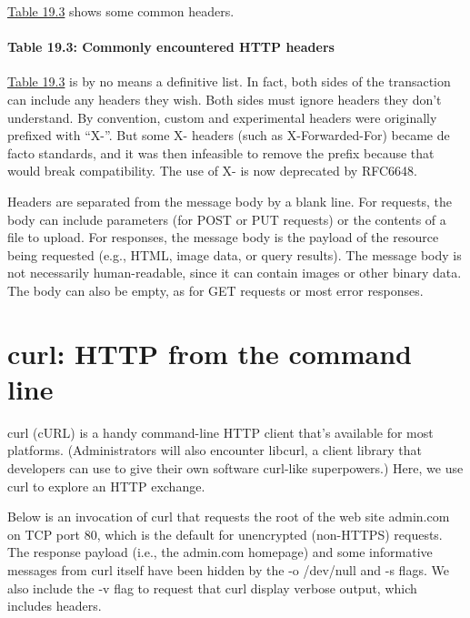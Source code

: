 \protect\hyperlink{part0027_split_003.htmlux5cux23_idTextAnchor1216}{Table
19.3} shows some common headers.

\paragraph[{Table 19.3: }Commonly encountered HTTP
headers]{\texorpdfstring{{Table 19.3:
}\protect\hypertarget{part0027_split_003.htmlux5cux23_idIndexMarker2762}{}{}\protect\hypertarget{part0027_split_003.htmlux5cux23_idTextAnchor1216}{}{}Commonly
encountered HTTP
headers}{Table 19.3: Commonly encountered HTTP headers}}


\protect\hyperlink{part0027_split_003.htmlux5cux23_idTextAnchor1216}{Table
19.3} is by no means a definitive list. In fact, both sides of the
transaction can include any headers they wish. Both sides must ignore
headers they don't understand. By convention, custom and experimental
headers were originally prefixed with ``X-''. But some X- headers (such
as X-Forwarded-For) became de facto standards, and it was then
infeasible to remove the prefix because that would break compatibility.
The use of X- is now deprecated by RFC6648.

Headers are separated from the message body by a blank line. For
requests, the body can include parameters (for POST or PUT requests) or
the contents of a file to upload. For responses, the message body is the
payload of the resource being requested (e.g., HTML, image data, or
query results). The message body is not necessarily human-readable,
since it can contain images or other binary data. The body can also be
empty, as for GET requests or most error responses.


\section{curl: HTTP from the command line}


\protect\hypertarget{part0027_split_004.htmlux5cux23_idIndexMarker2763}{}{}\protect\hypertarget{part0027_split_004.htmlux5cux23_idIndexMarker2764}{}{}{curl}
(cURL) is a handy command-line HTTP client that's available for most
platforms. (Administrators will also encounter {libcurl}, a client
library that developers can use to give their own software {curl}-like
superpowers.) Here, we use {curl} to explore an HTTP exchange.

Below is an invocation of {curl} that requests the root of the web site
{admin.com} on TCP port 80, which is the default for unencrypted
(non-HTTPS) requests. The response payload (i.e., the admin.com
homepage) and some informative messages from {curl} itself have been
hidden by the {-o /dev/null} and {-s} flags. We also include the {-v}
flag to request that {curl} display verbose output, which includes
headers.

